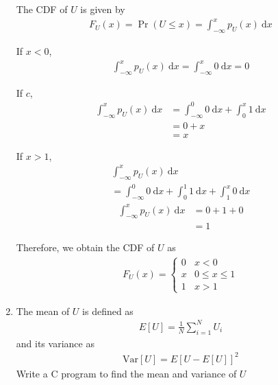 \documentclass[journal,12pt,twocolumn]{IEEEtran}
\providecommand{\pr}[1]{\ensuremath{\Pr\left(#1\right)}}
\providecommand{\mean}[1]{E\left[ #1 \right]}
\providecommand{\var}[1]{\mathrm{Var}\left[ #1 \right]}
\numberwithin{equation}{section}
\renewcommand\thesection{\arabic{section}}
\begin{document}
\begin{enumerate}[label=\thesection.\arabic*,ref=\thesection.\theenumi]
	The CDF of $U$ is given by
	\begin{align}
		F_{U}(x) = \pr{U \le x} = \int_{-\infty}^x p_{U}(x) ~\mathrm{d}x
	\end{align}
	
	If $x<0$,
	\begin{align}
		\int_{-\infty}^x p_{U}(x) ~\mathrm{d}x = \int_{-\infty}^x 0 ~\mathrm{d}x = 0
	\end{align}
	
	If $c$,
	\begin{align}
		\int_{-\infty}^x p_{U}(x) ~\mathrm{d}x &= \int_{-\infty}^0 0 ~\mathrm{d}x + \int_0^x 1 ~\mathrm{d}x \\
		&= 0 + x \\
		&= x
	\end{align}
	
	If $x>1$,
	\begin{multline}
		\int_{-\infty}^x p_{U}(x) ~\mathrm{d}x \\= \int_{-\infty}^0 0 ~\mathrm{d}x + \int_0^1 1 ~\mathrm{d}x +  \int_1^x 0 ~\mathrm{d}x 
	\end{multline}
	\begin{align}
		\int_{-\infty}^x p_{U}(x) ~\mathrm{d}x &= 0 + 1 + 0 \\
		&= 1
	\end{align}
	
	Therefore, we obtain the CDF of $U$ as
	\begin{align}
		F_{U}(x) = 
		\begin{cases}
			0 & x < 0 \\
			x & 0 \le x \le 1 \\
			1 & x > 1
		\end{cases}
	\end{align}
	
	\item The mean of $U$ is defined as
	\begin{align}
		\mean{U} = \frac{1}{N}\sum_{i=1}^{N}U_i
	\end{align}
	and its variance as
	\begin{align}
		\var{U} = \mean{U- \mean{U}}^2 
	\end{align}
	Write a C program to  find the mean and variance of $U$
	

\end{enumerate}
\end{document}
